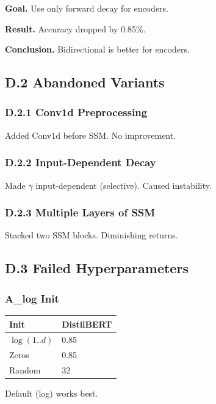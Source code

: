 \textbf{Goal.} Use only forward decay for encoders.

\textbf{Result.} Accuracy dropped by 0.85\%.

\textbf{Conclusion.} Bidirectional is better for encoders.

\subsection{D.2 Abandoned Variants}

\subsubsection{D.2.1 Conv1d Preprocessing}

Added Conv1d before SSM. No improvement.

\subsubsection{D.2.2 Input-Dependent Decay}

Made $\gamma$ input-dependent (selective). Caused instability.

\subsubsection{D.2.3 Multiple Layers of SSM}

Stacked two SSM blocks. Diminishing returns.

\subsection{D.3 Failed Hyperparameters}

\subsubsection{A\_log Init}

\begin{table}[H]
\centering
\small
\begin{tabular}{ll}
\toprule
\textbf{Init} & \textbf{DistilBERT} \\
\midrule
$\log(1..d)$ & 0.85 \\
Zeros & 0.85 \\
Random & 32 \\
\bottomrule
\end{tabular}
\end{table}

Default (log) works best.

